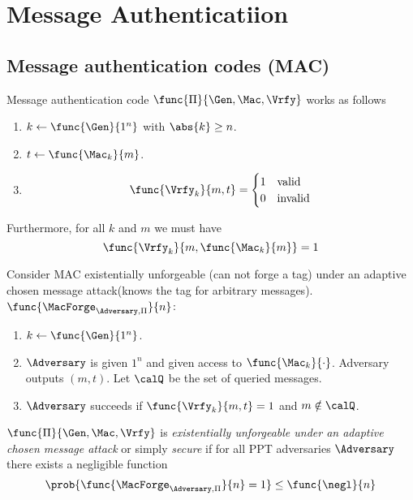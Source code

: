 \chapter{Message Authenticatiion}
\section{Message authentication codes (MAC)}
\begin{definition}
    Message authentication code \(\func{\Pi}{\Gen,\Mac, \Vrfy}\) works as follows 
    \begin{enumerate}
        \item \(k \gets \func{\Gen}{1^n}\) with \(\abs{k} \geq n\).
        \item \(t \gets \func{\Mac_k}{m}\).
        \item 
        \begin{equation*}
        \func{\Vrfy_k}{m,t} = \begin{cases}
            1 & \text{valid}\\
            0 & \text{invalid}
        \end{cases}
        \end{equation*}
    \end{enumerate}
    Furthermore, for all \(k\) and \(m\) we must have 
    \begin{equation*}
        \func{\Vrfy_k}{m , \func{\Mac_k}{m}} = 1
    \end{equation*}
\end{definition}
Consider MAC existentially unforgeable (can not forge a tag) under an adaptive chosen message attack(knows the tag for arbitrary messages). \(\func{\MacForge_{\Adversary, \Pi}}{n}\):
\begin{enumerate}
    \item \(k \gets \func{\Gen}{1^n}\).
    \item \(\Adversary\) is given \(1^n\) and given access to \(\func{\Mac_k}{\cdot}\). Adversary outputs \((m,t)\). Let \(\calQ\) be the set of queried messages.
    \item \(\Adversary\) succeeds if \(\func{\Vrfy_k}{m,t} = 1\) and \(m \notin \calQ\).
\end{enumerate}

\begin{definition}
    \(\func{\Pi}{\Gen,\Mac, \Vrfy}\) is \textit{existentially unforgeable under an adaptive chosen message attack} or simply \textit{secure} if for all PPT adversaries \(\Adversary\) there exists a negligible function 
    \begin{equation*}
        \prob{\func{\MacForge_{\Adversary,\Pi}}{n} = 1} \leq \func{\negl}{n}
    \end{equation*}
\end{definition}

